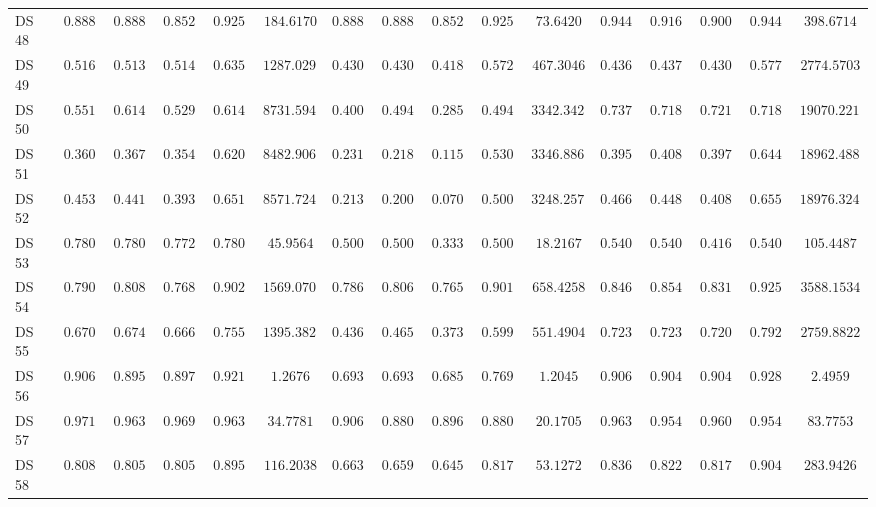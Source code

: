 {\begin{longtable}{|l|ccccc|ccccc|ccccc|}
		DS 48 & $0.8889$ & $0.8889$ & $0.8520$ & $0.9259$ & $184.6170$ & $0.8889$ & $0.8889$ & $0.8520$ & $0.9259$ & $73.6420$ & $0.9444$ & $0.9167$ & $0.9000$ & $0.9444$ & $398.6714$ \\
		DS 49 & $\boldsymbol{0.5160}$ & $\boldsymbol{0.5139}$ & $\boldsymbol{0.5143}$ & $\boldsymbol{0.6354}$ & $1287.0291$ & $0.4309$ & $0.4302$ & $0.4181$ & $0.5727$ & $467.3046$ & $0.4362$ & $0.4372$ & $0.4305$ & $0.5779$ & $2774.5703$ \\
		DS 50 & $0.5511$ & $0.6143$ & $0.5297$ & $0.6143$ & $8731.5947$ & $0.4000$ & $0.4945$ & $0.2857$ & $0.4945$ & $3342.3423$ & $0.7378$ & $0.7181$ & $0.7218$ & $0.7181$ & $19070.2217$ \\
		DS 51 & $0.3600$ & $0.3677$ & $0.3542$ & $0.6206$ & $8482.9067$ & $0.2311$ & $0.2180$ & $0.1157$ & $0.5308$ & $3346.8863$ & $\boldsymbol{0.3956}$ & $\boldsymbol{0.4082}$ & $\boldsymbol{0.3971}$ & $\boldsymbol{0.6449}$ & $18962.4883$ \\
		DS 52 & $0.4533$ & $0.4418$ & $0.3935$ & $0.6511$ & $8571.7240$ & $0.2133$ & $0.2000$ & $0.0706$ & $0.5000$ & $3248.2572$ & $\boldsymbol{0.4667}$ & $\boldsymbol{0.4483}$ & $\boldsymbol{0.4084}$ & $\boldsymbol{0.6552}$ & $18976.3241$ \\
		DS 53 & $\boldsymbol{0.7800}$ & $\boldsymbol{0.7800}$ & $\boldsymbol{0.7726}$ & $\boldsymbol{0.7800}$ & $45.9564$ & $0.5000$ & $0.5000$ & $0.3333$ & $0.5000$ & $18.2167$ & $0.5400$ & $0.5400$ & $0.4165$ & $0.5400$ & $105.4487$ \\
		DS 54 & $0.7900$ & $0.8081$ & $0.7682$ & $0.9024$ & $1569.0706$ & $0.7867$ & $0.8060$ & $0.7658$ & $0.9014$ & $658.4258$ & $\boldsymbol{0.8467}$ & $\boldsymbol{0.8541}$ & $\boldsymbol{0.8316}$ & $\boldsymbol{0.9258}$ & $3588.1534$ \\
		DS 55 & $0.6702$ & $0.6743$ & $0.6667$ & $0.7557$ & $1395.3823$ & $0.4362$ & $0.4656$ & $0.3735$ & $0.5992$ & $551.4904$ & $\boldsymbol{0.7234}$ & $\boldsymbol{0.7235}$ & $\boldsymbol{0.7209}$ & $\boldsymbol{0.7926}$ & $2759.8822$ \\
		DS 56 & $0.9067$ & $0.8952$ & $0.8978$ & $0.9214$ & $1.2676$ & $0.6933$ & $0.6930$ & $0.6854$ & $0.7698$ & $1.2045$ & $\boldsymbol{0.9067}$ & $\boldsymbol{0.9049}$ & $\boldsymbol{0.9041}$ & $\boldsymbol{0.9287}$ & $2.4959$ \\
		DS 57 & $0.9714$ & $0.9632$ & $0.9695$ & $0.9632$ & $34.7781$ & $0.9061$ & $0.8809$ & $0.8961$ & $0.8809$ & $20.1705$ & $0.9633$ & $0.9546$ & $0.9608$ & $0.9546$ & $83.7753$ \\
		DS 58 & $0.8085$ & $0.8057$ & $0.8055$ & $0.8959$ & $116.2038$ & $0.6631$ & $0.6598$ & $0.6450$ & $0.8178$ & $53.1272$ & $0.8369$ & $0.8225$ & $0.8175$ & $0.9049$ & $283.9426$ \\

\end{longtable}}
